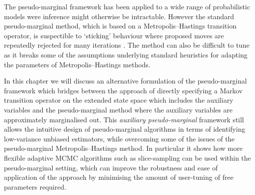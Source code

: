 The pseudo-marginal framework has been applied to a wide range of probabilistic models were inference might otherwise be intractable. However the standard pseudo-marginal method, which is based on a Metro\-polis--Hastings transition operator, is suspectible to `sticking' behaviour where proposed moves are repeatedly rejected for many iterations \citep{andrieu2009pseudo,sherlock2015efficiency}. The method can also be difficult to tune as it breaks some of the assumptions underlying standard heuristics for adapting the parameters of Metropolis--Hastings methods.




In this chapter we will discuss an alternative formulation of the pseudo-marginal framework which bridges between the approach of directly specifying a Markov transition operator on the extended state space which includes the auxiliary variables and the pseudo-marginal method where the auxiliary variables are approximately marginalised out. This \emph{auxiliary pseudo-marginal} framework still allows the intuitive design of pseudo-marginal algorithms in terms of identifying low-variance unbiased estimators, while overcoming some of the issues of the pseudo-marginal Metropolis--Hastings method. In particular it shows how more flexible adaptive \ac{MCMC} algorithms such as slice-sampling can be used within the pseudo-marginal setting, which can improve the robustness and ease of application of the approach by minimising the amount of user-tuning of free parameters required.

